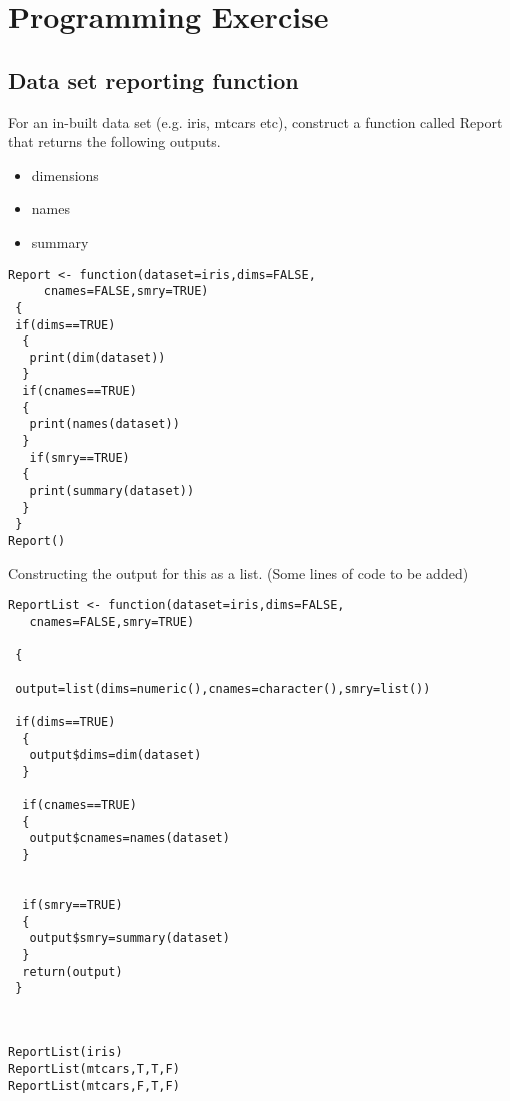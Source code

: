 \documentclass[12pt]{article}
\begin{document}
\tableofcontents
\newpage

\section{Programming Exercise}

\subsection{Data set reporting function}
For an in-built data set (e.g. iris, mtcars etc), construct a function called Report that returns
the following outputs.

\begin{itemize}
\item dimensions
\item names
\item summary
\end{itemize}

\begin{framed}
\begin{verbatim}
Report <- function(dataset=iris,dims=FALSE,
     cnames=FALSE,smry=TRUE)
 {
 if(dims==TRUE)
  {
   print(dim(dataset))
  }
  if(cnames==TRUE)
  {
   print(names(dataset))
  }
   if(smry==TRUE)
  {
   print(summary(dataset))
  }
 }
Report()
\end{verbatim}
\end{framed}
\newpage
\noindent Constructing the output for this as a list. (Some lines of code to be added)

\begin{framed}
\begin{verbatim}
ReportList <- function(dataset=iris,dims=FALSE,
   cnames=FALSE,smry=TRUE)

 {

 output=list(dims=numeric(),cnames=character(),smry=list())

 if(dims==TRUE)
  {
   output$dims=dim(dataset)
  }

  if(cnames==TRUE)
  {
   output$cnames=names(dataset)
  }


  if(smry==TRUE)
  {
   output$smry=summary(dataset)
  }
  return(output)
 }



\end{verbatim}
\end{framed}

\begin{verbatim}
ReportList(iris)
ReportList(mtcars,T,T,F)
ReportList(mtcars,F,T,F)
\end{verbatim}
\newpage
\end{document}
